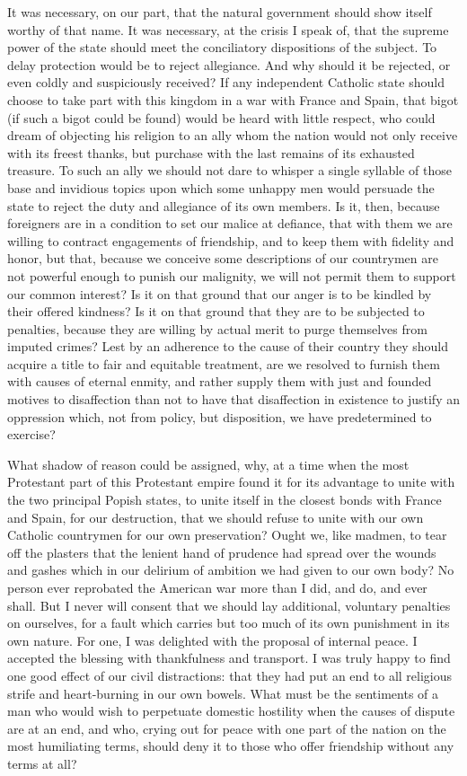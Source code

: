 It was necessary, on our part, that the natural government should show itself worthy of that name. It was necessary, at the crisis I speak of, that the supreme power of the state should meet the conciliatory dispositions of the subject. To delay protection would be to reject allegiance. And why should it be rejected, or even coldly and suspiciously received? If any independent Catholic state should choose to take part with this kingdom in a war with France and Spain, that bigot (if such a bigot could be found) would be heard with little respect, who could dream of objecting his religion to an ally whom the nation would not only receive with its freest thanks, but purchase with the last remains of its exhausted treasure. To such an ally we should not dare to whisper a single syllable of those base and invidious topics upon which some unhappy men would persuade the state to reject the duty and allegiance of its own members. Is it, then, because foreigners are in a condition to set our malice at defiance, that with them we are willing to contract engagements of friendship, and to keep them with fidelity and honor, but that, because we conceive some descriptions of our countrymen are not powerful enough to punish our malignity, we will not permit them to support our common interest? Is it on that ground that our anger is to be kindled by their offered kindness? Is it on that ground that they are to be subjected to penalties, because they are willing by actual merit to purge themselves from imputed crimes? Lest by an adherence to the cause of their country they should acquire a title to fair and equitable treatment, are we resolved to furnish them with causes of eternal enmity, and rather supply them with just and founded motives to disaffection than not to have that disaffection in existence to justify an oppression which, not from policy, but disposition, we have predetermined to exercise?

What shadow of reason could be assigned, why, at a time when the most Protestant part of this Protestant empire found it for its advantage to unite with the two principal Popish states, to unite itself in the closest bonds with France and Spain, for our destruction, that we should refuse to unite with our own Catholic countrymen for our own preservation? Ought we, like madmen, to tear off the plasters that the lenient hand of prudence had spread over the wounds and gashes which in our delirium of ambition we had given to our own body? No person ever reprobated the American war more than I did, and do, and ever shall. But I never will consent that we should lay additional, voluntary penalties on ourselves, for a fault which carries but too much of its own punishment in its own nature. For one, I was delighted with the proposal of internal peace. I accepted the blessing with thankfulness and transport. I was truly happy to find one good effect of our civil distractions: that they had put an end to all religious strife and heart-burning in our own bowels. What must be the sentiments of a man who would wish to perpetuate domestic hostility when the causes of dispute are at an end, and who, crying out for peace with one part of the nation on the most humiliating terms, should deny it to those who offer friendship without any terms at all?

